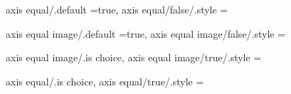 axis equal/.default                                                =true,                                                                                                                              
axis equal/false/.style                                            ={                                                                                                                                  
axis equal image/.default                                          =true,                                                                                                                              
axis equal image/false/.style                                      ={                                                                                                                                 
axis equal image/.is choice,
axis equal image/true/.style                                       ={                                                                                                                                 
axis equal/.is choice,
axis equal/true/.style                                             ={                                                                                                                                  

}}}}
